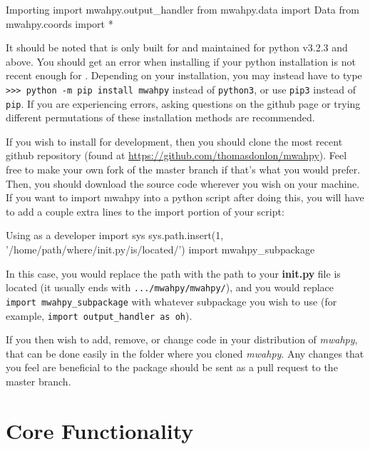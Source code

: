 \documentclass{article}
\begin{document}
\begin{codelisting}{Importing \mwahpy}
import mwahpy.output_handler
from mwahpy.data import Data
from mwahpy.coords import *
\end{codelisting}

It should be noted that \mwahpy is only built for and maintained for python v3.2.3 and above. You should get an error when installing if your python installation is not recent enough for \mwahpy. Depending on your installation, you may instead have to type \verb!>>> python -m pip install mwahpy! instead of \verb!python3!, or use \verb!pip3! instead of \verb!pip!. If you are experiencing errors, asking questions on the \mwahpy github page or trying different permutations of these installation methods are recommended. 

If you wish to install \mwahpy for development, then you should clone the most recent \mwahpy github repository (found at \url{https://github.com/thomasdonlon/mwahpy}). Feel free to make your own fork of the master branch if that's what you would prefer. Then, you should download the source code wherever you wish on your machine. If you want to import mwahpy into a python script after doing this, you will have to add a couple extra lines to the import portion of your script: \\

\begin{codelisting}{Using \mwahpy as a developer}
import sys
sys.path.insert(1, '/home/path/where/init.py/is/located/')
import mwahpy_subpackage
\end{codelisting}

In this case, you would replace the path with the path to your \textbf{init.py} file is located (it usually ends with \verb!.../mwahpy/mwahpy/!), and you would replace \verb!import mwahpy_subpackage! with whatever subpackage you wish to use (for example, \verb!import output_handler as oh!). 

If you then wish to add, remove, or change code in your distribution of \textit{mwahpy}, that can be done easily in the folder where you cloned \textit{mwahpy}. Any changes that you feel are beneficial to the package should be sent as a pull request to the master branch. 

\section{Core Functionality}
\end{document}
